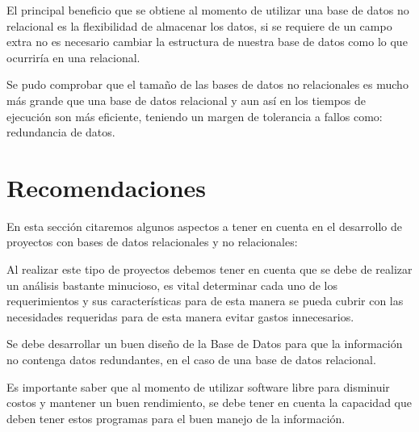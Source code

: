 \documentclass[twoside,twocolumn]{article}
\begin{document}
 

El principal beneficio que se obtiene al momento de utilizar una base de datos no relacional es la flexibilidad de almacenar los datos, si se requiere de un campo extra no es necesario cambiar la estructura de nuestra base de datos como lo que ocurriría en una relacional. 

Se pudo comprobar que el tamaño de las bases de datos no relacionales es mucho más grande que una base de datos relacional y aun así en los tiempos de ejecución son más eficiente, teniendo un margen de tolerancia a fallos como: redundancia de datos. 
\section{Recomendaciones}
En esta sección citaremos algunos aspectos a tener en cuenta en el desarrollo de proyectos con bases de datos relacionales y no relacionales: 

 

Al realizar este tipo de proyectos debemos tener en cuenta que se debe de realizar un análisis bastante minucioso, es vital determinar cada uno de los requerimientos y sus características para de esta manera se pueda cubrir con las necesidades requeridas para de esta manera evitar gastos innecesarios. 
 

Se debe desarrollar un buen diseño de la Base de Datos para que la información no contenga datos redundantes, en el caso de una base de datos relacional. 

 
 

Es importante saber que al momento de utilizar software libre para disminuir costos y mantener un buen rendimiento, se debe tener en cuenta la capacidad que deben tener estos programas para el buen manejo de la información. 

\end{document}
